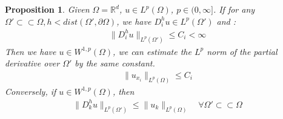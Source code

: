\documentclass[a4paper,11pt,oneside,fleqn]{book}
\newtheorem{proposition}[theorem]{Proposition}
\theoremstyle{definition}
\theoremstyle{remark}
\begin{document}
\begin{proposition}
	Given $\Omega = \mathbb{R}^d$, $u \in L^p(\Omega) $, $p \in (0, \infty]$. If for any $\Omega' \subset \subset \Omega, h < dist(\Omega', \partial\Omega)$,  we have $D_i^h u \in L^p(\Omega')$ and  :
	\begin{align*} 
		\|D_i^h u \|_{L^p(\Omega')} \le  C_i  < \infty
	\end{align*}
	Then we have $u \in W^{1, p}(\Omega)$, we can estimate the $L^p$ norm of the partial derivative over $\Omega'$ by the same constant. 
	\begin{align*}
		\|u_{x_i}\|_{L^p(\Omega)} \le C_i
	\end{align*}
	Conversely, if $u \in W^{1, p}(\Omega)$, then 
	\begin{align*}
		\|D^h_k u \|_{L^p(\Omega')} \le \|u_k\|_{L^p(\Omega)} \quad \forall \Omega'\subset \subset \Omega
	\end{align*}
\end{proposition}
\end{document}
